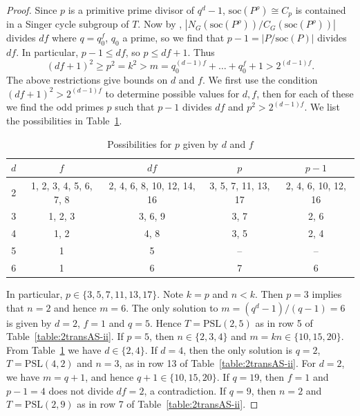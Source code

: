 \documentclass[12pt]{amsart}
\theoremstyle{remark}
\theoremstyle{definition}
\newcommand{\PSL}{\mathrm{PSL}}
\begin{document}
\begin{proof}
Since $p$ is a primitive prime divisor of $q^d-1$,   $\mathrm{soc}(P^\rho) \cong C_p$ is contained in a Singer cycle subgroup of $T$. Now by \cite[Kapitel II, 7.3]{HuppertI}, $|N_G(\mathrm{soc}(P^\rho))/C_G(\mathrm{soc}(P^\rho))|$ divides $df$ where $q=q_0^f$, $q_0$ a prime,  so we find that $p-1 = |P/\mathrm{soc}(P)|$ divides $df$. 
 In particular, $p-1 \leqslant df$, so $p \leqslant df+1$. Thus  
$$
(df+1)^2 \geqslant p^2 = k^2 > m = q_0^{(d-1)f}+\dots +q_0^f +1 > 2^{(d-1)f}.
$$
The above restrictions give bounds on $d$ and $f$. We first use the condition $(df+1)^2 > 2^{(d-1)f}$ to determine possible values for $d, f$, then for each of these we find the odd primes $p$ such that $p-1$ divides $df$ and $p^2 > 2^{(d-1)f}$. We list the possibilities in Table~\ref{tab: d and f}. 
\begin{table}[h]
\begin{tabular}{ c | c | c | c | c   }
$d$ & $f$ & $df$ & $p$   & $p-1$ \\ 
\hline%
2 & 1, 2, 3, 4, 5, 6, 7, 8 &  2, 4, 6, 8, 10, 12, 14, 16 & 3, 5, 7, 11, 13, 17 & 2, 4, 6, 10, 12, 16 \\
3 & 1, 2, 3 & 3, 6, 9 &3, 7 &  2,  6 \\
4 & 1, 2  & 4, 8 &3, 5 &  2, 4 \\
5 & 1 & 5 & -- & -- \\
6 & 1 & 6 & 7 & 6 
\end{tabular}
\caption{Possibilities for $p$ given by $d$ and $f$}
\label{tab: d and f}
\end{table}

In particular, $p\in \{3,5, 7,11,13,17\}$. Note $k=p$ and $n<k$. Then $p=3$ implies that $n=2$ and hence $m=6$. The only solution to $m=(q^d-1)/(q-1)=6$ is given by $d=2$, $f=1$ and $q=5$. Hence $T=\PSL(2,5)$ as in row 5 of Table~\ref{table:2transAS-ii}. If $p=5$, then $n\in \{2,3,4\}$ and $m=kn \in \{10,15,20\}$.  From Table~\ref{tab: d and f} we have $d \in \{2,4\}$. If $d=4$, then the only solution is $q=2$, $T=\PSL(4,2)$ and $n=3$, as in row 13 of Table~\ref{table:2transAS-ii}. For $d=2$, we have $m=q+1$, and  hence $q+1 \in \{10,15,20\}$. If $q=19$, then $f=1$ and $p-1=4$ does not divide $df=2$, a contradiction. If $q=9$, then $n=2$ and $T=\PSL(2,9)$ as in row 7 of Table~\ref{table:2transAS-ii}.


\end{proof}
\end{document}
